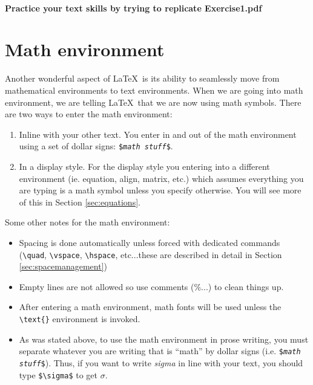 \documentclass[]{article}%
\newcommand{\bs}{\textbackslash}
\newcommand{\TT}[1]{\texttt{#1}}
\newcommand{\tpc}{\textperiodcentered}
\theoremstyle{definition}
\begin{document}
\paragraph{Practice your text skills by trying to replicate Exercise1.pdf}
\clearpage


\section{Math environment}
\label{sec:math}
Another wonderful aspect of \LaTeX\ is its ability to seamlessly move from mathematical environments to text environments.
When we are going into math environment, we are telling \LaTeX\ that we are now using math symbols.
There are two ways to enter the math environment:
\begin{enumerate}
	\item Inline with your other text.
	You enter in and out of the math environment using a set of dollar signs: \TT{\$\textit{math stuff}\$}.
	\item In a display style.
	For the display style you entering into a different environment (ie. equation, align, matrix, etc.) which assumes everything you are typing is a math symbol unless you specify otherwise.
	You will see more of this in Section \ref{sec:equations}.  
\end{enumerate}
%
Some other notes for the math environment: 
\begin{itemize}
	\item Spacing is done automatically unless forced with dedicated commands (\texttt{\bs quad}, \texttt{\bs vspace}, \texttt{\bs hspace}, etc...these are described in detail in Section \ref{sec:spacemanagement})
	\item Empty lines are not allowed so use comments (\%...) to clean things up.
	\item After entering a math environment, math fonts will be used unless the \texttt{\bs text\{\tpc\}} environment is invoked.
	\item As was stated above, to use the math environment in prose writing, you must separate whatever you are writing that is ``math'' by dollar signs (i.e. \TT{\$\textit{math stuff}\$}).
	Thus, if you want to write \emph{sigma} in line with your text, you should type \TT{\$\bs sigma\$} to get $\sigma$.
\end{itemize}
%
\end{document}
